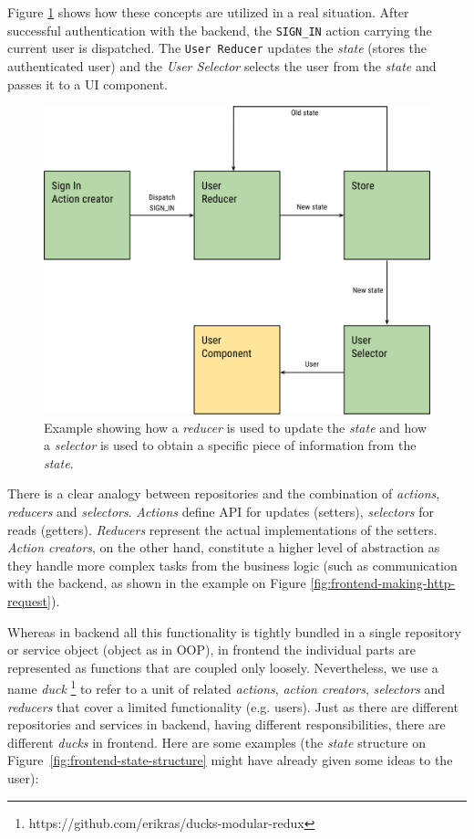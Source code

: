 Figure \ref{fig:frontend-reducer-and-selector} shows how these concepts are utilized in a real situation. After successful authentication with the backend, the \texttt{SIGN\_IN} action carrying the current user is dispatched. The \texttt{User Reducer} updates the \emph{state} (stores the authenticated user) and the \emph{User Selector} selects the user from the \emph{state} and passes it to a UI component.
\begin{figure}
	\centering
	\includegraphics[width=120mm]{img/04_frontend_reducer_and_selector.png}
	\caption{Example showing how a \emph{reducer} is used to update the \emph{state} and how a \emph{selector} is used to obtain a specific piece of information from the \emph{state}.} 
	\label{fig:frontend-reducer-and-selector}
\end{figure}

There is a clear analogy between repositories and the combination of \emph{actions}, \emph{reducers} and \emph{selectors}. \emph{Actions} define API for updates (setters), \emph{selectors} for reads (getters). \emph{Reducers} represent the actual implementations of the setters. \emph{Action creators}, on the other hand,  constitute a higher level of abstraction as they handle more complex tasks from the business logic (such as communication with the backend, as shown in the example on Figure \ref{fig:frontend-making-http-request}). 

Whereas in backend all this functionality is tightly bundled in a single repository or service object (object as in OOP), in frontend the individual parts are represented as functions that are coupled only loosely. Nevertheless, we use a name \emph{duck} \footnote{https://github.com/erikras/ducks-modular-redux} to refer to a unit of related \emph{actions}, \emph{action creators}, \emph{selectors} and \emph{reducers} that cover a limited functionality (e.g. users). Just as there are different repositories and services in backend, having different responsibilities, there are different \emph{ducks} in frontend. Here are some examples (the \emph{state} structure on Figure~\ref{fig:frontend-state-structure} might have already given some ideas to the user):

